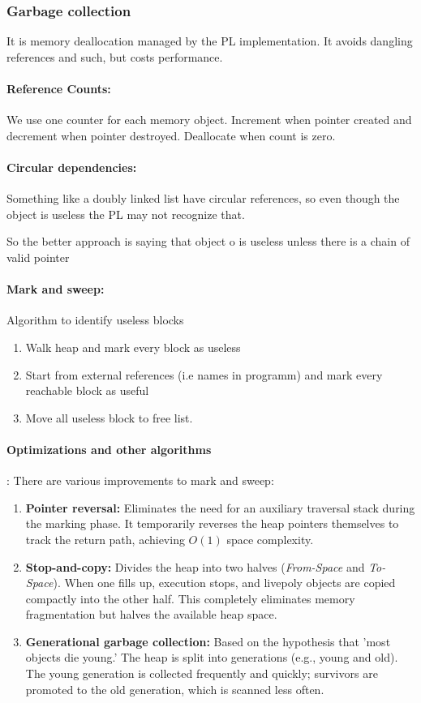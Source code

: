 \documentclass{article}
\begin{document}
\subsubsection{Garbage collection}
It is memory deallocation managed by the PL implementation. It avoids dangling references and such, but costs performance.

\paragraph{Reference Counts: } We use one counter for each memory object. Increment when pointer created and decrement when pointer destroyed. Deallocate when count is zero.

\paragraph{Circular dependencies: } Something like a doubly linked list have circular references, so even though the object is useless the PL may not recognize that.

So the better approach is saying that object o is useless unless there is a chain of valid pointer

\paragraph{Mark and sweep: } Algorithm to identify useless blocks

\begin{enumerate}
  \item Walk heap and mark every block as useless
  \item Start from external references (i.e names in programm) and mark every reachable block as useful
  \item Move all useless block to free list.
\end{enumerate}
\paragraph{Optimizations and other algorithms}: There are various improvements to mark and sweep:
\begin{enumerate}
  \item \textbf{Pointer reversal:} Eliminates the need for an auxiliary traversal stack during the marking phase. It temporarily reverses the heap pointers themselves to track the return path, achieving $O(1)$ space complexity.
  \item \textbf{Stop-and-copy:} Divides the heap into two halves (\textit{From-Space} and \textit{To-Space}). When one fills up, execution stops, and livepoly objects are copied compactly into the other half. This completely eliminates memory fragmentation but halves the available heap space.
  \item \textbf{Generational garbage collection:} Based on the hypothesis that 'most objects die young.' The heap is split into generations (e.g., young and old). The young generation is collected frequently and quickly; survivors are promoted to the old generation, which is scanned less often.
\end{enumerate}
\end{document}

